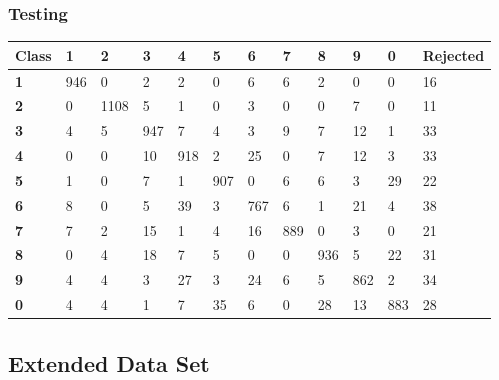 \documentclass[
  a4paper,            %
  DIV=10,             %
  oneside,            %
  BCOR=5mm,           %
  parskip=half,       %
  numbers=noenddot,   %
  bibtotoc,           %
  listof=totoc,        %
  article
]{scrreprt}
\begin{document}
\subsubsection{Testing}
\begin{center}
  \begin{tabular}{|p{1cm}|p{1cm}|p{1cm}|p{1cm}|p{1cm}|p{1cm}|p{1cm}|p{1cm}|p{1cm}|p{1cm}|p{1cm}|p{1.7cm}|}
    \hline
    \textbf{Class} & \textbf{1} & \textbf{2} & \textbf{3} & \textbf{4} & \textbf{5} & \textbf{6} & \textbf{7} & \textbf{8} & \textbf{9} & \textbf{0} & \textbf{Rejected} \\
    \hline
    \textbf{1} & 946 & 0 & 2 & 2 & 0 & 6 & 6 & 2 & 0 & 0 & 16 \\
    \hline
    \textbf{2} & 0 & 1108 & 5 & 1 & 0 & 3 & 0 & 0 & 7 & 0 & 11 \\
    \hline
    \textbf{3} & 4 & 5 & 947 & 7 & 4 & 3 & 9 & 7 & 12 & 1 & 33 \\
    \hline
    \textbf{4} & 0 & 0 & 10 & 918 & 2 & 25 & 0 & 7 & 12 & 3 & 33 \\
    \hline
    \textbf{5} & 1 & 0 & 7 & 1 & 907 & 0 & 6 & 6 & 3 & 29 & 22 \\
    \hline
    \textbf{6} & 8 & 0 & 5 & 39 & 3 & 767 & 6 & 1 & 21 & 4 & 38 \\
    \hline
    \textbf{7} & 7 & 2 & 15 & 1 & 4 & 16 & 889 & 0 & 3 & 0 & 21 \\
    \hline
    \textbf{8} & 0 & 4 & 18 & 7 & 5 & 0 & 0 & 936 & 5 & 22 & 31 \\
    \hline
    \textbf{9} & 4 & 4 & 3 & 27 & 3 & 24 & 6 & 5 & 862 & 2 & 34 \\
    \hline
    \textbf{0} & 4 & 4 & 1 & 7 & 35 & 6 & 0 & 28 & 13 & 883 & 28 \\
    \hline
  \end{tabular}
\end{center}
\subsection{Extended Data Set}
\end{document}
